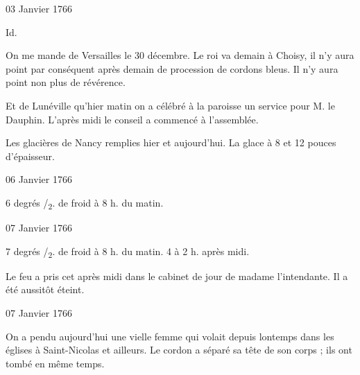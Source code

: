                      \begin{diary}{03 Janvier 1766}{}


                           Id. \bigskip


                         On me mande de Versailles
                           le 30 décembre.
                           Le roi va demain à
                              Choisy, il n'y aura point
                           par conséquent après demain de procession de
                           cordons bleus. Il n'y aura
                           point non plus de
                           révérence. \bigskip


                         Et de Lunéville qu'hier matin on a célébré
                           à la paroisse un service pour M. le Dauphin.
                           L'après midi le conseil a commencé
                           à l'assemblée. \bigskip


                         Les glacières de Nancy remplies hier et
                           aujourd'hui. La glace à 8 et 12 pouces d'épaisseur. \bigskip


                     \end{diary}

                     \begin{diary}{06 Janvier 1766}{}


                           6 degrés
                              /\textsubscript{2}. de froid à
                              8 h. du
                              matin. \bigskip


                     \end{diary}

                     \begin{diary}{07 Janvier 1766}{}


                           7 degrés
                              /\textsubscript{2}. de froid à
                              8 h. du
                              matin. 4 à
                           2 h. après
                              midi. \bigskip


                         Le feu a pris cet après midi dans le
                           cabinet
                           de jour de madame l'intendante. Il a été aussitôt
                           éteint. \bigskip


                     \end{diary}

                     \begin{diary}{07 Janvier 1766}{}

                         On a pendu aujourd'hui une vielle
                           femme
                           qui volait depuis lontemps dans les églises
                              à Saint-Nicolas et ailleurs. Le cordon a séparé
                           sa tête de son corps ; ils ont tombé en
                           même temps. \bigskip


                     \end{diary}

